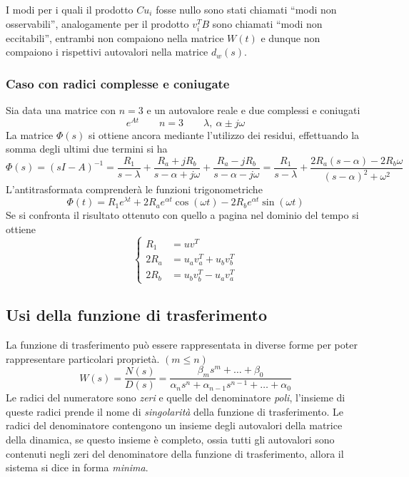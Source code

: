 I modi per i quali il prodotto $Cu_i$ fosse nullo sono stati chiamati ``modi
non osservabili'', analogamente per il prodotto $v_i^TB$ sono chiamati ``modi
non eccitabili'', entrambi non compaiono nella matrice $W(t)$ e dunque non
compaiono i rispettivi autovalori nella matrice $d_w(s)$.

\newpage
\subsubsection{Caso con radici complesse e coniugate}
Sia data una matrice con $n=3$ e un autovalore reale e due complessi e coniugati
$$
e^{At} \qquad n=3 \qquad \lambda,\ \alpha \pm j\omega
$$
La matrice $\Phi(s)$ si ottiene ancora mediante l'utilizzo dei residui,
effettuando la somma degli ultimi due termini si ha
$$
\Phi(s) = (sI-A)^{-1} = \frac{R_1}{s-\lambda} + \frac{R_a +
jR_b}{s-\alpha+j\omega} + \frac{R_a -
jR_b}{s-\alpha-j\omega} = \frac{R_1}{s-\lambda} +
\frac{2R_a(s-\alpha)-2R_b\omega}{(s-\alpha)^2+\omega^2}
$$
L'antitrasformata comprenderà le funzioni trigonometriche
$$
\Phi(t) = R_1e^{\lambda t} + 2R_ae^{\alpha t}\cos(\omega t) -
2R_be^{\alpha
t}\sin(\omega t)
$$
Se si confronta il risultato ottenuto con quello a pagina
\pageref{radici_complesse_coniugate_tempo} nel dominio del tempo si ottiene
$$
\left\{\begin{aligned}
R_1 &= uv^T \\
2R_a &= u_av_a^T + u_bv_b^T\\
2R_b &= u_bv_b^T - u_av_a^T
\end{aligned}\right.
$$

\subsection{Usi della funzione di trasferimento}
La funzione di trasferimento può essere rappresentata in diverse forme per
poter rappresentare particolari proprietà. $(m\leq n)$
$$
W(s) = \frac{N(s)}{D(s)} = \frac{\beta_ms^m + \ldots + \beta_0}{\alpha_ns^n +
\alpha_{n-1}s^{n-1} +\ldots +\alpha_0}
$$
Le radici del numeratore sono \textit{zeri} e quelle del denominatore
\textit{poli}, l'insieme di queste radici prende il nome di
\textit{singolarità} della funzione di trasferimento.
Le radici del denominatore contengono un insieme degli autovalori della matrice
della dinamica, se questo insieme è completo, ossia tutti gli autovalori sono
contenuti negli zeri del denominatore della funzione di trasferimento, allora
il sistema si dice in forma \textit{minima}.

